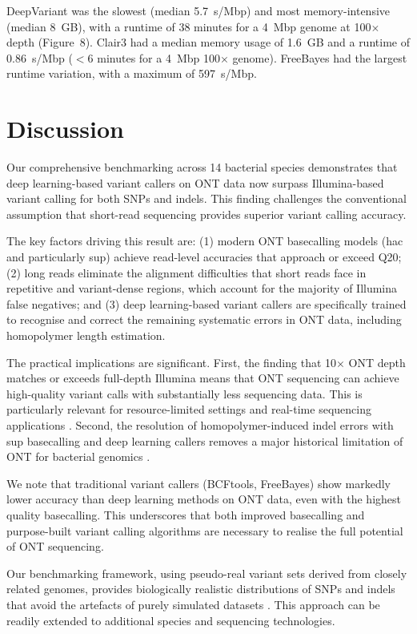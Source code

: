 \documentclass[11pt]{article}
\begin{document}
DeepVariant was the slowest (median 5.7~s/Mbp) and most memory-intensive (median 8~GB), with a runtime of 38 minutes for a 4~Mbp genome at 100$\times$ depth (Figure~8). Clair3 had a median memory usage of 1.6~GB and a runtime of 0.86~s/Mbp ($<$6 minutes for a 4~Mbp 100$\times$ genome). FreeBayes had the largest runtime variation, with a maximum of 597~s/Mbp.

\section{Discussion}

Our comprehensive benchmarking across 14 bacterial species demonstrates that deep learning-based variant callers on ONT data now surpass Illumina-based variant calling for both SNPs and indels. This finding challenges the conventional assumption that short-read sequencing provides superior variant calling accuracy.

The key factors driving this result are: (1) modern ONT basecalling models (hac and particularly sup) achieve read-level accuracies that approach or exceed Q20; (2) long reads eliminate the alignment difficulties that short reads face in repetitive and variant-dense regions, which account for the majority of Illumina false negatives; and (3) deep learning-based variant callers are specifically trained to recognise and correct the remaining systematic errors in ONT data, including homopolymer length estimation.

The practical implications are significant. First, the finding that 10$\times$ ONT depth matches or exceeds full-depth Illumina means that ONT sequencing can achieve high-quality variant calls with substantially less sequencing data. This is particularly relevant for resource-limited settings and real-time sequencing applications \citep{quick2016,faria2016}. Second, the resolution of homopolymer-induced indel errors with sup basecalling and deep learning callers removes a major historical limitation of ONT for bacterial genomics \citep{sahlin2021}.

We note that traditional variant callers (BCFtools, FreeBayes) show markedly lower accuracy than deep learning methods on ONT data, even with the highest quality basecalling. This underscores that both improved basecalling and purpose-built variant calling algorithms are necessary to realise the full potential of ONT sequencing.

Our benchmarking framework, using pseudo-real variant sets derived from closely related genomes, provides biologically realistic distributions of SNPs and indels that avoid the artefacts of purely simulated datasets \citep{bush2020,chen2024}. This approach can be readily extended to additional species and sequencing technologies.
\end{document}
